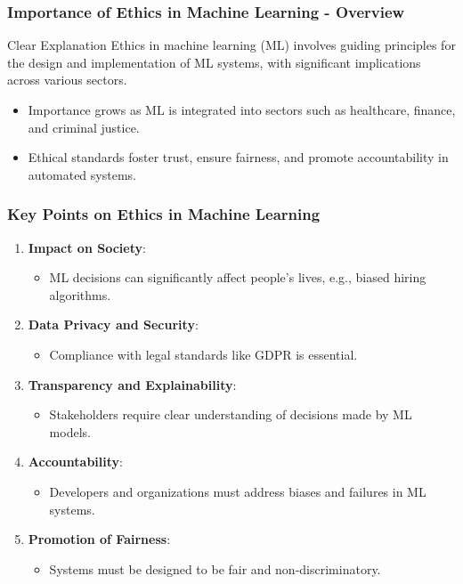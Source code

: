 \documentclass[aspectratio=169]{beamer}
\begin{document}
\begin{frame}[fragile]
    \frametitle{Importance of Ethics in Machine Learning - Overview}
    \begin{block}{Clear Explanation}
        Ethics in machine learning (ML) involves guiding principles for the design and implementation of ML systems, with significant implications across various sectors.
    \end{block}
    \begin{itemize}
        \item Importance grows as ML is integrated into sectors such as healthcare, finance, and criminal justice.
        \item Ethical standards foster trust, ensure fairness, and promote accountability in automated systems.
    \end{itemize}
\end{frame}

\begin{frame}[fragile]
    \frametitle{Key Points on Ethics in Machine Learning}
    \begin{enumerate}
        \item \textbf{Impact on Society}:
            \begin{itemize}
                \item ML decisions can significantly affect people's lives, e.g., biased hiring algorithms.
            \end{itemize}
        \item \textbf{Data Privacy and Security}:
            \begin{itemize}
                \item Compliance with legal standards like GDPR is essential.
            \end{itemize}
        \item \textbf{Transparency and Explainability}:
            \begin{itemize}
                \item Stakeholders require clear understanding of decisions made by ML models.
            \end{itemize}
        \item \textbf{Accountability}:
            \begin{itemize}
                \item Developers and organizations must address biases and failures in ML systems.
            \end{itemize}
        \item \textbf{Promotion of Fairness}:
            \begin{itemize}
                \item Systems must be designed to be fair and non-discriminatory.
            \end{itemize}
    \end{enumerate}
\end{frame}
\end{document}
